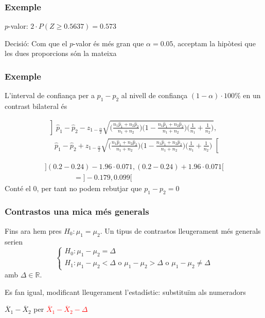 \documentclass[12pt,t]{beamer}\usepackage[]{graphicx}\usepackage[]{color}
\newcommand{\red}[1]{\textcolor{red}{#1}}
\renewcommand{\emph}[1]{{\color{red}#1}}
\newcommand{\RR}{\mathbb{R}}
\renewcommand{\geq}{\geqslant}
\theoremstyle{plain}
\theoremstyle{definition}
\begin{document}
\begin{frame}
\frametitle{Exemple}

\emph{$p$-valor}: $2\cdot P(Z\geq 0.5637)=0.573$
\medskip

\emph{Decisió}: Com que el $p$-valor és més gran que $\alpha=0.05$, acceptam la hipòtesi que les dues proporcions són la mateixa

\end{frame}
\begin{frame}
\frametitle{Exemple}

L'\emph{interval de confiança} per a  $p_1-p_2$
al nivell de confiança $(1-\alpha)\cdot 100\%$ en un contrast bilateral és
{\small $$
\begin{array}{l}
\left]\widehat{p}_1-\widehat{p}_2-z_{1-\frac{\alpha}{2}}\sqrt{\Big(\frac{n_1 \widehat{p}_1 +n_2 \widehat{p}_2}{n_1
+n_2}\Big)\Big(1-\frac{n_1 \widehat{p}_1 +n_2 \widehat{p}_2}{n_1
+n_2}\Big)\Big(\frac{1}{n_1}+\frac{1}{n_2}
\Big)},\right.\\[2ex]
\quad
\left.\widehat{p}_1-\widehat{p}_2+z_{1-\frac{\alpha}{2}}\sqrt{\Big(\frac{n_1 \widehat{p}_1 +n_2 \widehat{p}_2}{n_1
+n_2}\Big)\Big(1-\frac{n_1 \widehat{p}_1 +n_2 \widehat{p}_2}{n_1
+n_2}\Big)\Big(\frac{1}{n_1}+\frac{1}{n_2}
\Big)}
\right[
\end{array}
$$

}
\pause\bigskip

$$
\begin{array}{l}
](0.2 -0.24)-1.96\cdot 0.071,(0.2 -0.24)+1.96\cdot 0.071[\\
\qquad\qquad =]-0.179,0.099[
\end{array}
$$
Conté el 0, per tant no podem rebutjar que $p_1-p_2=0$
\end{frame}


\begin{frame}
\frametitle{Contrastos una mica més generals}

Fins ara hem pres $H_0:\mu_1=\mu_2$. Un tipus de contrastos lleugerament més generals serien
$$
\left\{\begin{array}{l}
H_0:\mu_1-\mu_2=\Delta\\
H_1:\mu_1-\mu_2<\Delta\mbox{ o }\mu_1-\mu_2>\Delta\mbox{ o }\mu_1-\mu_2\neq\Delta
\end{array}\right.
$$
amb $\Delta\in \RR$.
\medskip

Es fan igual, modificant lleugerament l'estadístic: substituïm als numeradors
\begin{center}
$\overline{X}_1-\overline{X}_2$ per
\red{$\overline{X}_1-\overline{X}_2-\Delta$}
\end{center}


\end{frame}
\end{document}
